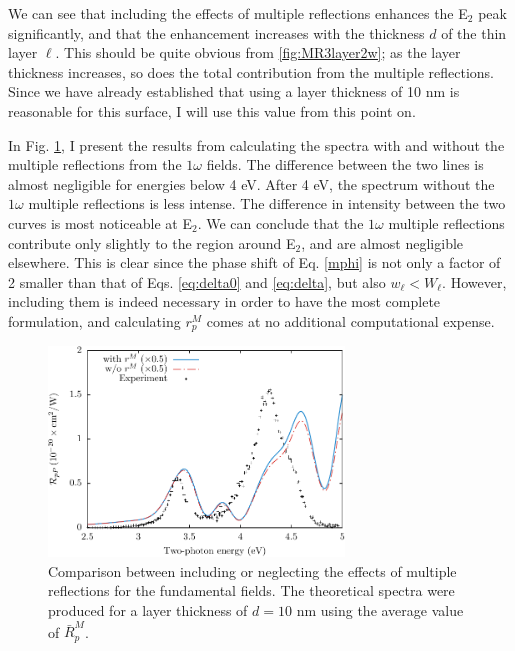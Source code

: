 We can see that including the effects of multiple reflections enhances the
E$_{2}$ peak significantly, and that the enhancement increases with the
thickness $d$ of the thin layer $\ell$. This should be quite obvious from
\ref{fig:MR3layer2w}; as the layer thickness increases, so does the total
contribution from the multiple reflections. Since we have already established
that using a layer thickness of 10 nm is reasonable for this surface, I will use
this value from this point on.

In Fig. \ref{fig:mr21w}, I present the results from calculating the spectra with
and without the multiple reflections from the $1\omega$ fields. The difference
between the two lines is almost negligible for energies below 4 eV. After 4 eV,
the spectrum without the $1\omega$ multiple reflections is less intense. The
difference in intensity between the two curves is most noticeable at E$_{2}$. We
can conclude that the $1\omega$ multiple reflections contribute only slightly to
the region around E$_{2}$, and are almost negligible elsewhere. This is clear
since the phase shift of Eq. \eqref{mphi} is not only a factor of 2 smaller than
that of Eqs. \eqref{eq:delta0} and \eqref{eq:delta}, but also $w_\ell < W_\ell$.
However, including them is indeed necessary in order to have the most complete
formulation, and calculating $r^{M}_{p}$ comes at no additional computational
expense.

\begin{figure}[H]
\centering
\includegraphics[width=0.7\textwidth]{content/figures/fig-Si1x1-MRno1w}
\caption{Comparison between including or neglecting the effects of multiple
reflections for the fundamental fields. The theoretical spectra were produced
for a layer thickness of $d = 10$ nm using the average value of
$\bar{R}^{M}_{p}$.}
\label{fig:mr21w}
\end{figure}


